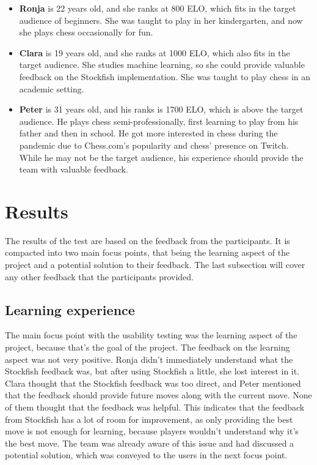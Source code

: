 \begin{itemize}

    \item \textbf{Ronja} is 22 years old, and she ranks at 800 ELO, which fits in the target audience of beginners.
    She was taught to play in her kindergarten, and now she plays chess occasionally for fun.

    \item \textbf{Clara} is 19 years old, and she ranks at 1000 ELO, which also fits in the target audience.
    She studies machine learning, so she could provide valuable feedback on the Stockfish implementation.
    She was taught to play chess in an academic setting.

    \item \textbf{Peter} is 31 years old, and his ranks is 1700 ELO, which is above the target audience.
    He plays chess semi-professionally, first learning to play from his father and then in school.
    He got more interested in chess during the pandemic due to Chess.com's popularity and chess' presence on Twitch.
    While he may not be the target audience, his experience should provide the team with valuable feedback.

\end{itemize}

\section{Results}\label{sec:results}

The results of the test are based on the feedback from the participants.
It is compacted into two main focus points, that being the learning aspect of the project and a potential solution to
their feedback.
The last subsection will cover any other feedback that the participants provided.

\subsection{Learning experience}\label{subsec:learning-experience}

The main focus point with the usability testing was the learning aspect of the project, because that's the goal of the
project.
The feedback on the learning aspect was not very positive.
Ronja didn't immediately understand what the Stockfish feedback was, but after using Stockfish a little, she lost
interest in it.
Clara thought that the Stockfish feedback was too direct, and Peter mentioned that the feedback should provide future
moves along with the current move.
None of them thought that the feedback was helpful.
This indicates that the feedback from Stockfish has a lot of room for improvement, as only providing the best move is
not enough for learning, because players wouldn't understand why it's the best move.
The team was already aware of this issue and had discussed a potential solution, which was conveyed to the users in the
next focus point.

